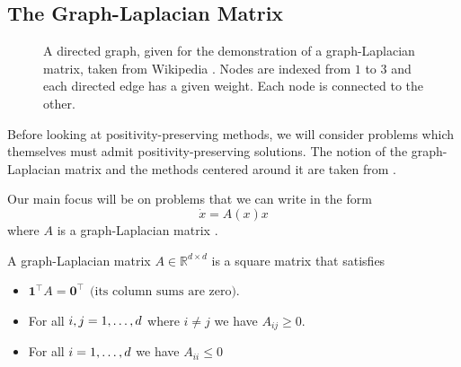\subsection{The Graph-Laplacian Matrix}

\begin{figure}
    \centering
    \caption{
    	A directed graph, given for the demonstration of a graph-Laplacian matrix, taken from Wikipedia \cite{Wikipedia_2024}.
    	Nodes are indexed from $1$ to $3$ and each directed edge has a given weight.
    	Each node is connected to the other.
    }
    \label{fig:graph1998}
\end{figure}

Before looking at positivity-preserving methods, we will consider problems which themselves must admit positivity-preserving solutions.
The notion of the graph-Laplacian matrix and the methods centered around it are taken from \cite{blanes_pos_2022}.

Our main focus will be on problems that we can write in the form 
\begin{equation*}
    \dot{x} = A(x)x
\end{equation*}
where $A$ is a graph-Laplacian matrix \cite{blanes_pos_2022}.

\begin{definition}
    A graph-Laplacian matrix $A \in \mathds{R}^{d \times d}$ is a square matrix that satisfies
    \begin{itemize}
        \item $\mathbf{1}^\intercal A = \mathbf{0}^\intercal ~~ \text{(its column sums are zero)}.$
        \item For all $i, j = 1, \mathellipsis, d$ where $i \ne j$ we have $A_{ij} \ge 0$.
        \item For all $i = 1, \mathellipsis, d$ we have $A_{ii} \le 0$
    \end{itemize}
\end{definition}

